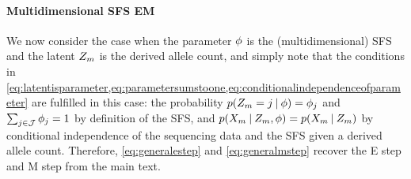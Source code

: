 \paragraph{Multidimensional SFS EM}

We now consider the case when the parameter $\phi$ is the (multidimensional) SFS and the latent $\ct[m]$ is the derived allele count, and simply note that the conditions in \cref{eq:latentisparameter,eq:parametersumstoone,eq:conditionalindependenceofparameter} are fulfilled in this case:
the probability $\prob(\ct_m = j \given \sfs) = \sfs_j$ and $\sum_{j \in \mathcal{J}} \phi_j = 1$ by definition of the SFS, and $\prob(\data[m] \given \ct_m, \sfs) = \prob(\data[m] \given \ct_m)$ by conditional independence of the sequencing data and the SFS given a derived allele count.
Therefore, \cref{eq:generalestep} and \cref{eq:generalmstep} recover the E step and M step from the main text.

\printbibliography
